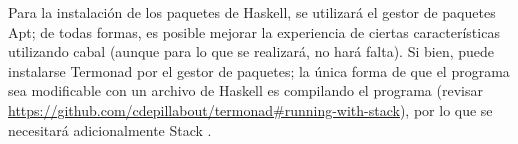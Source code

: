 \normalsize{ \indent
Para la instalación de los paquetes de Haskell,
se utilizará el gestor de paquetes Apt; de todas
formas, es posible mejorar la experiencia de
ciertas características utilizando cabal (aunque
para lo que se realizará, no hará falta).
}
\newline
\normalsize{ \indent
Si bien, puede instalarse Termonad por el gestor
de paquetes; la única forma de que el programa
sea modificable con un archivo de Haskell es
compilando el programa (revisar
\url{https://github.com/cdepillabout/termonad#running-with-stack}),
por lo que se necesitará adicionalmente Stack
\cite{haskell_stack}.
}
